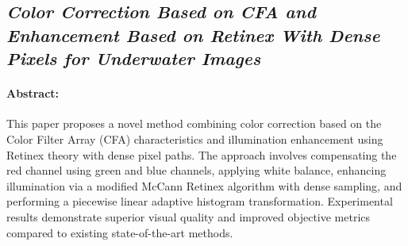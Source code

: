 \subsection{\textit{Color Correction Based on CFA and Enhancement
        Based on Retinex With Dense Pixels for
        Underwater Images\cite{Li_2020}}}

\paragraph{Abstract:}
This paper proposes a novel method combining color correction based on the Color Filter Array (CFA) characteristics and illumination enhancement using Retinex theory with dense pixel paths. The approach involves compensating the red channel using green and blue channels, applying white balance, enhancing illumination via a modified McCann Retinex algorithm with dense sampling, and performing a piecewise linear adaptive histogram transformation. Experimental results demonstrate superior visual quality and improved objective metrics compared to existing state-of-the-art methods.

